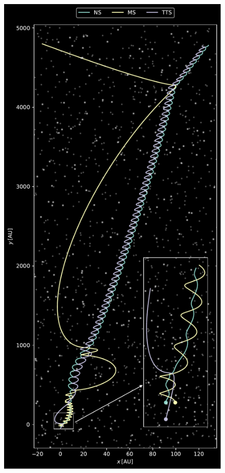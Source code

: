 \documentclass[twocolumn, twocolappendix]{aastex631}
\begin{document}
\begin{figure}[htb]
    \centering
    \includegraphics[width=\columnwidth]{rat_formation.pdf}

\end{figure}
\end{document}
